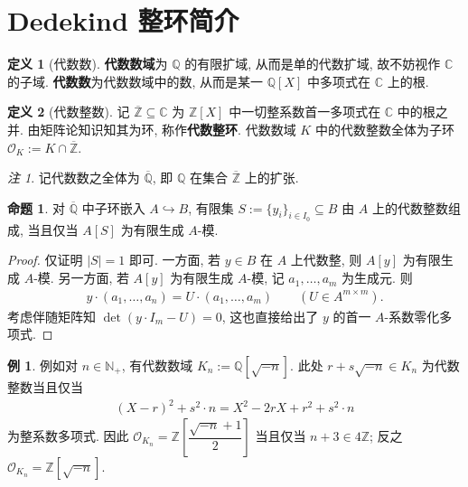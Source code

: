\documentclass{MainStyle}
\theoremstyle{definition}
\newtheorem{example}{例}
\theoremstyle{definition}
\theoremstyle{definition}
\newtheorem{definition}{定义}
\theoremstyle{definition}
\newtheorem{proposition}{命题}
\theoremstyle{definition}
\theoremstyle{definition}
\theoremstyle{definition}
\theoremstyle{remark}
\newtheorem{remark}{注}
\theoremstyle{remark}
\begin{document}
\maketitle
\section{Dedekind 整环简介}

\begin{definition}[代数数]
    \textbf{代数数域}为 $\mathbb Q$ 的有限扩域, 从而是单的代数扩域, 故不妨视作 $\mathbb C$ 的子域. \textbf{代数数}为代数数域中的数, 从而是某一 $\mathbb Q[X]$ 中多项式在 $\mathbb C$ 上的根.
\end{definition}

\begin{definition}[代数整数]
    记 $\overline{\mathbb Z}\subseteq \mathbb C$ 为 $\mathbb Z[X]$ 中一切整系数首一多项式在 $\mathbb C$ 中的根之并. 由矩阵论知识知其为环, 称作\textbf{代数整环}. 代数数域 $K$ 中的代数整数全体为子环 $\mathcal O_K:=K\cap \overline{\mathbb Z}$.
\end{definition}

\begin{remark}
    记代数数之全体为 $\overline{\mathbb Q}$, 即 $\mathbb Q$ 在集合 $\overline{\mathbb Z}$ 上的扩张.
\end{remark}

\begin{proposition}
    对 $\overline{\mathbb Q}$ 中子环嵌入 $A\hookrightarrow B$, 有限集 $S:=\{y_i\}_{i\in I_0}\subseteq B$ 由 $A$ 上的代数整数组成, 当且仅当 $A[S]$ 为有限生成 $A$-模.
    \begin{proof}
        仅证明 $|S|=1$ 即可. 一方面, 若 $y\in B$ 在 $A$ 上代数整, 则 $A[y]$ 为有限生成 $A$-模. 另一方面, 若 $A[y]$ 为有限生成 $A$-模, 记 $a_1,\ldots, a_m$ 为生成元. 则
        \begin{align*}
            y\cdot (a_1,\ldots, a_n)=U\cdot (a_1,\ldots, a_m)\qquad (U\in A^{m\times m}).
        \end{align*}
        考虑伴随矩阵知 $\det(y\cdot I_m-U)=0$, 这也直接给出了 $y$ 的首一 $A$-系数零化多项式.
    \end{proof}
\end{proposition}

\begin{example}
    例如对 $n\in \mathbb N_+$, 有代数数域 $K_n:=\mathbb Q[\sqrt{-n}]$. 此处 $r+s\sqrt{-n}\in K_n$ 为代数整数当且仅当
    \begin{align*}
        (X-r)^2+s^2\cdot n=X^2-2rX+r^2+s^2\cdot n
    \end{align*}
    为整系数多项式. 因此 $\mathcal O_{K_n}=\mathbb Z\left[\dfrac{\sqrt{-n}+1}{2}\right]$ 当且仅当 $n+3\in 4\mathbb Z$; 反之 $\mathcal O_{K_n}=\mathbb Z[\sqrt{-n}]$.
\end{example}
\end{document}
